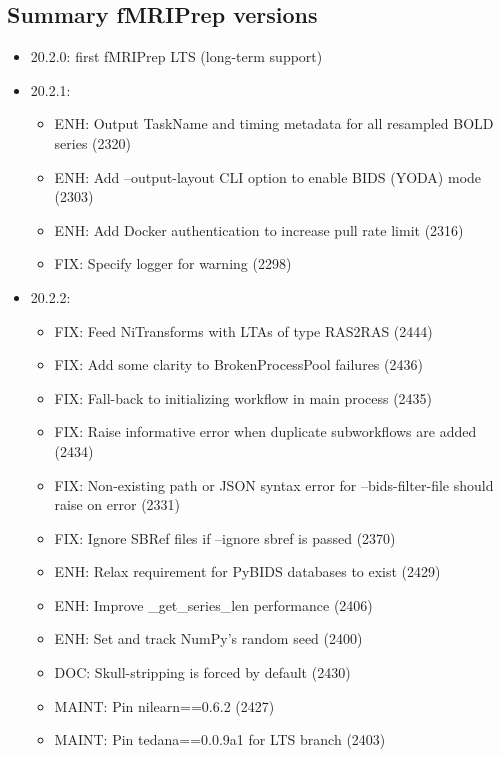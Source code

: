 \documentclass{article}
\newcommand{\fmriprep}{fMRIPrep\xspace}
\begin{document}
\begin{appendices}
    \section*{Summary \fmriprep versions}

    \begin{itemize}
        \item 20.2.0: first fMRIPrep LTS (long-term support)
        \item 20.2.1:
              \begin{itemize}
                  \item ENH: Output TaskName and timing metadata for all resampled BOLD series (2320)
                  \item ENH: Add --output-layout CLI option to enable BIDS (YODA) mode (2303)
                  \item ENH: Add Docker authentication to increase pull rate limit (2316)
                  \item FIX: Specify logger for warning (2298)
              \end{itemize}
        \item 20.2.2:
              \begin{itemize}
                  \item FIX: Feed NiTransforms with LTAs of type RAS2RAS (2444)
                  \item FIX: Add some clarity to BrokenProcessPool failures (2436)
                  \item FIX: Fall-back to initializing workflow in main process (2435)
                  \item FIX: Raise informative error when duplicate subworkflows are added (2434)
                  \item FIX: Non-existing path or JSON syntax error for --bids-filter-file should raise on error (2331)
                  \item FIX: Ignore SBRef files if --ignore sbref is passed (2370)
                  \item ENH: Relax requirement for PyBIDS databases to exist (2429)
                  \item ENH: Improve \_get\_series\_len performance (2406)
                  \item ENH: Set and track NumPy's random seed (2400)
                  \item DOC: Skull-stripping is forced by default (2430)
                  \item MAINT: Pin nilearn==0.6.2 (2427)
                  \item MAINT: Pin tedana==0.0.9a1 for LTS branch (2403)

\end{itemize}
\end{itemize}
\end{appendices}
\end{document}
